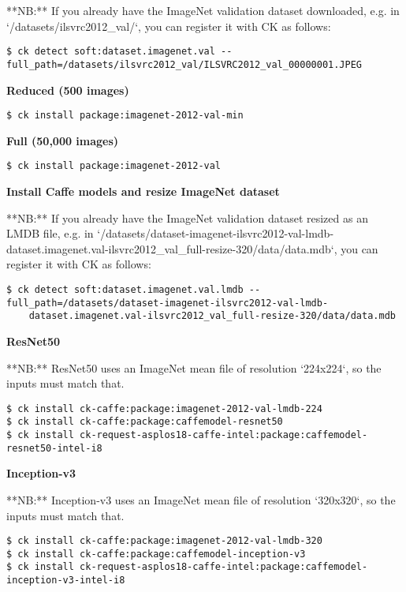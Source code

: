\documentclass[sigplan]{acmart}
\begin{document}
**NB:** If you already have the ImageNet validation dataset downloaded, e.g. in
`/datasets/ilsvrc2012\_val/`, you can register it with CK as follows:

\begin{verbatim}
$ ck detect soft:dataset.imagenet.val --full_path=/datasets/ilsvrc2012_val/ILSVRC2012_val_00000001.JPEG
\end{verbatim}

\textbf{Reduced (500 images)}
\begin{verbatim}
$ ck install package:imagenet-2012-val-min
\end{verbatim}

\textbf{Full (50,000 images)}
\begin{verbatim}
$ ck install package:imagenet-2012-val
\end{verbatim}

\textbf{Install Caffe models and resize ImageNet dataset}

**NB:** If you already have the ImageNet validation dataset resized as an LMDB file, 
e.g. in `/datasets/dataset-imagenet-ilsvrc2012-val-lmdb-dataset.imagenet.val-ilsvrc2012\_val\_full-resize-320/data/data.mdb`, 
you can register it with CK as follows:

\begin{verbatim}
$ ck detect soft:dataset.imagenet.val.lmdb --full_path=/datasets/dataset-imagenet-ilsvrc2012-val-lmdb-
    dataset.imagenet.val-ilsvrc2012_val_full-resize-320/data/data.mdb
\end{verbatim}

\textbf{ResNet50}

**NB:** ResNet50 uses an ImageNet mean file of resolution `224x224`, so the inputs must match that.

\begin{verbatim}
$ ck install ck-caffe:package:imagenet-2012-val-lmdb-224
$ ck install ck-caffe:package:caffemodel-resnet50
$ ck install ck-request-asplos18-caffe-intel:package:caffemodel-resnet50-intel-i8
\end{verbatim}

\textbf{Inception-v3}

**NB:** Inception-v3 uses an ImageNet mean file of resolution `320x320`, so the inputs must match that.

\begin{verbatim}
$ ck install ck-caffe:package:imagenet-2012-val-lmdb-320
$ ck install ck-caffe:package:caffemodel-inception-v3
$ ck install ck-request-asplos18-caffe-intel:package:caffemodel-inception-v3-intel-i8
\end{verbatim}
\end{document}
